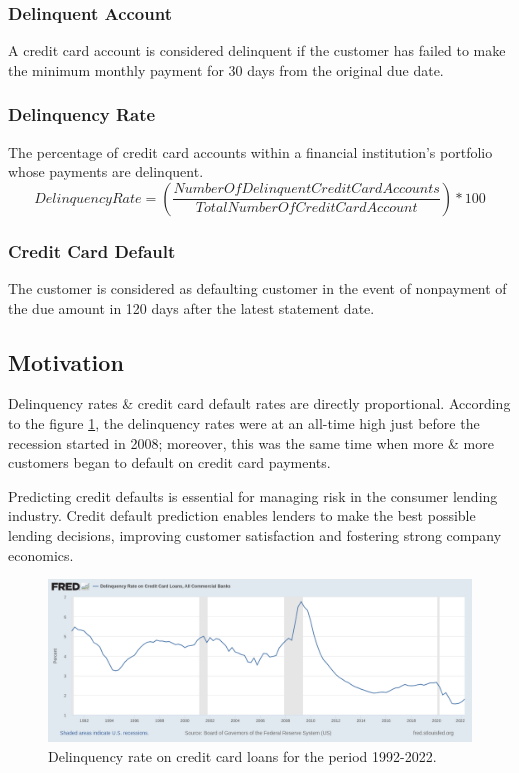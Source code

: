 \documentclass[twoside,11pt,a4paper]{article}
\begin{document}
\subsubsection{Delinquent Account}
A credit card account is considered delinquent if the customer has failed to make the minimum monthly payment for 30 days from the original due date.

\subsubsection{Delinquency Rate}
The percentage of credit card accounts within a financial institution's portfolio whose payments are delinquent.
\begin{equation}
	Delinquency Rate = \left(\frac{Number Of Delinquent Credit Card Accounts}{Total Number Of Credit Card Account}\right) * 100
\end{equation}

\subsubsection{Credit Card Default}
The customer is considered as defaulting customer in the event of nonpayment of the due amount in 120 days after the latest statement date.

\subsection{Motivation}
Delinquency rates \& credit card default rates are directly proportional. According to the  figure \ref{fig:fredgraph}, the delinquency rates were at an all-time high just before the recession started in 2008; moreover, this was the same time when more \& more customers began to default on credit card payments. 

Predicting credit defaults is essential for managing risk in the consumer lending industry. Credit default prediction enables lenders to make the best possible lending decisions, improving customer satisfaction and fostering strong company economics. \\

\begin{figure}[ht]
	\centering
	\includegraphics[width=1.0\textwidth]{fredgraph}
	\caption[Delinquency rate on credit card loans for the period 1992-2022]{Delinquency rate on credit card loans for the period 1992-2022{\citep{fedgraph_delinquency_history}}.}
	\label{fig:fredgraph}
\end{figure}
\end{document}
